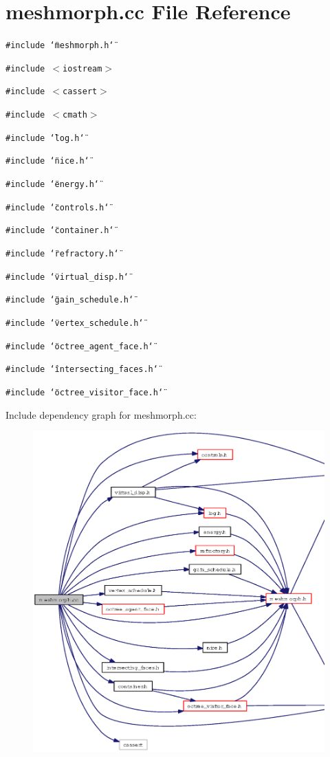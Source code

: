 \section{meshmorph.cc File Reference}
\label{meshmorph_8cc}
{\tt \#include \char`\"{}meshmorph.h\char`\"{}}\par
{\tt \#include $<$iostream$>$}\par
{\tt \#include $<$cassert$>$}\par
{\tt \#include $<$cmath$>$}\par
{\tt \#include \char`\"{}log.h\char`\"{}}\par
{\tt \#include \char`\"{}nice.h\char`\"{}}\par
{\tt \#include \char`\"{}energy.h\char`\"{}}\par
{\tt \#include \char`\"{}controls.h\char`\"{}}\par
{\tt \#include \char`\"{}container.h\char`\"{}}\par
{\tt \#include \char`\"{}refractory.h\char`\"{}}\par
{\tt \#include \char`\"{}virtual\_\-disp.h\char`\"{}}\par
{\tt \#include \char`\"{}gain\_\-schedule.h\char`\"{}}\par
{\tt \#include \char`\"{}vertex\_\-schedule.h\char`\"{}}\par
{\tt \#include \char`\"{}octree\_\-agent\_\-face.h\char`\"{}}\par
{\tt \#include \char`\"{}intersecting\_\-faces.h\char`\"{}}\par
{\tt \#include \char`\"{}octree\_\-visitor\_\-face.h\char`\"{}}\par


Include dependency graph for meshmorph.cc:\begin{figure}[H]
\begin{center}
\leavevmode
\includegraphics[width=336pt]{meshmorph_8cc__incl}
\end{center}
\end{figure}
